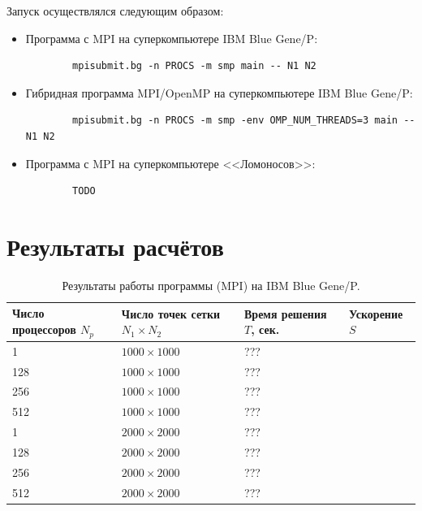 \documentclass[11pt]{article}
\numberwithin{equation}{section}
\theoremstyle{plain}
\theoremstyle{definition}
\begin{document}
Запуск осуществлялся следующим образом:
\begin{itemize}
    \item Программа с MPI на суперкомпьютере IBM Blue Gene/P:
        \begin{verbatim}
        mpisubmit.bg -n PROCS -m smp main -- N1 N2
        \end{verbatim}
    \item Гибридная программа MPI/OpenMP на суперкомпьютере IBM Blue Gene/P:
        \begin{verbatim}
        mpisubmit.bg -n PROCS -m smp -env OMP_NUM_THREADS=3 main -- N1 N2
        \end{verbatim}
    \item Программа с MPI на суперкомпьютере <<Ломоносов>>:
        \begin{verbatim}
        TODO
        \end{verbatim}
\end{itemize}

\newpage
\section{Результаты расчётов}
\begin{table}[h]
\centering
\begin{tabular}{|l|l|l|l|}\hline
Число процессоров $N_p$ & Число точек сетки $N_1 \times N_2$ & Время решения $T$, сек. & Ускорение $S$ \\ \hline
1                       & $1000 \times 1000$                 & ???                     &               \\
128                     & $1000 \times 1000$                 & ???                     &               \\
256                     & $1000 \times 1000$                 & ???                     &               \\
512                     & $1000 \times 1000$                 & ???                     &               \\ \hline
1                       & $2000 \times 2000$                 & ???                     &               \\
128                     & $2000 \times 2000$                 & ???                     &               \\
256                     & $2000 \times 2000$                 & ???                     &               \\
512                     & $2000 \times 2000$                 & ???                     &               \\ \hline
\end{tabular}
    \caption{Результаты работы программы (MPI) на IBM Blue Gene/P.}
\label{tab_mpi}
\end{table}
\end{document}
